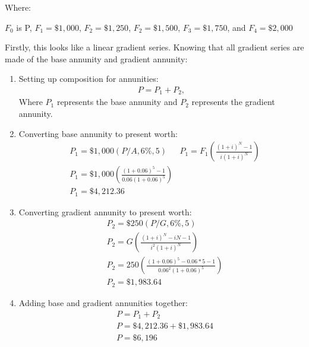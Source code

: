 \documentclass{report} %
\begin{document}
{
}
\newline
Where:
\begin{center}
    $F_0$ is P, $F_1 = \$1,000$, $F_2 = \$1,250$, $F_2 = \$1,500$, $F_3 = \$1,750$, and $F_4 = \$2,000$
\end{center}
Firstly, this looks like a linear gradient series. Knowing that all gradient series are made of the base annunity and gradient annunity:
\begin{enumerate}
    \item Setting up composition for annunities:
    \begin{equation*}
        \begin{aligned}
            P = P_1 + P_2,
        \end{aligned}
    \end{equation*}
    Where $P_1$ represents the base annunity and $P_2$ represents the gradient annunity.
    \item Converting base annunity to present worth:
    \begin{equation*}
        \begin{aligned}
            &P_1 = \$1,000(P/A,6\%,5)
            &P_1 = F_1\left(\frac{(1+i)^N-1}{i(1+i)^N}\right) \\
            &P_1 = \$1,000\left(\frac{(1+0.06)^{5}-1}{0.06(1+0.06)^{5}}\right) \\
            &P_1 = \$4,212.36
        \end{aligned}
    \end{equation*}
    \item Converting gradient annunity to present worth:
    \begin{equation*}
        \begin{aligned}
            &P_2 = \$250(P/G,6\%,5) \\
            &P_2 = G\left(\frac{(1+i)^N - iN -1}{i^2(1+i)^N}\right) \\
            &P_2 = 250\left(\frac{(1+0.06)^5 - 0.06*5 -1}{0.06^2(1+0.06)^5}\right) \\
            &P_2 = \$1,983.64
        \end{aligned}
    \end{equation*}
    \item Adding base and gradient annunities together:
    \begin{equation*}
        \begin{aligned}
            &P = P_1 + P_2 \\
            &P = \$4,212.36 + \$1,983.64 \\
            &P = \$6,196 
        \end{aligned}
    \end{equation*}
\end{enumerate}
\end{document}
